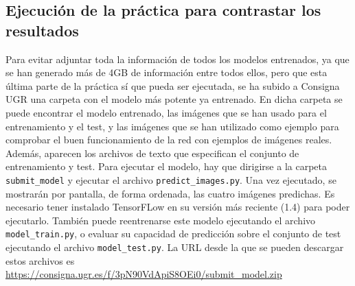 \documentclass[11pt]{article}
\theoremstyle{plain}
\theoremstyle{definition}
\begin{document}
\subsection{Ejecución de la práctica para contrastar los resultados}

Para evitar adjuntar toda la información de todos los modelos
entrenados, ya que se han generado más de 4GB de información entre
todos ellos, pero que esta última parte de la práctica sí que pueda
ser ejecutada, se ha subido a Consigna UGR una carpeta con el modelo
más potente ya entrenado. En dicha carpeta se puede encontrar el
modelo entrenado, las imágenes que se han usado para el entrenamiento
y el test, y las imágenes que se han utilizado como ejemplo para
comprobar el buen funcionamiento de la red con ejemplos de imágenes
reales. Además, aparecen los archivos de texto que especifican el
conjunto de entrenamiento y test. Para ejecutar el modelo, hay que
dirigirse a la carpeta \texttt{submit\_model} y ejecutar el archivo
\texttt{predict\_images.py}. Una vez ejecutado, se mostrarán por
pantalla, de forma ordenada, las cuatro imágenes predichas. Es
necesario tener instalado TensorFLow en su versión más reciente (1.4)
para poder ejecutarlo. También puede reentrenarse este modelo
ejecutando el archivo \texttt{model\_train.py}, o evaluar su capacidad
de predicción sobre el conjunto de test ejecutando el archivo
\texttt{model\_test.py}. La URL desde la que se pueden descargar
estos archivos es
\url{https://consigna.ugr.es/f/3pN90VdApiS8OEi0/submit_model.zip}

\printbibliography
\end{document}

